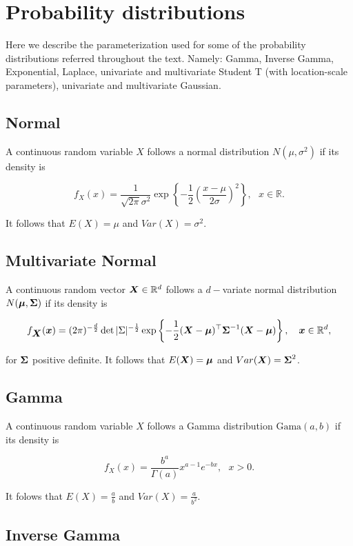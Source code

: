 

\chapter{Probability distributions}
\label{appendix_A}

Here we describe the parameterization used for some of the probability distributions referred throughout the text. Namely: Gamma, Inverse Gamma, Exponential, Laplace, univariate and multivariate Student T (with location-scale parameters), univariate and multivariate Gaussian.

\section{Normal}

A continuous random variable $X$ follows a normal distribution $N(\mu, \sigma^2)$ if its density is

$$ f_X(x) = \frac{1}{\sqrt{2\pi}\sigma^2} \exp\left\{-\frac{1}{2}\left( \frac{x - \mu}{2\sigma}\right)^2\right\}, \ \ \ x \in \mathbb{R}.$$

It follows that $E(X) = \mu$ and $Var(X) = \sigma^2$.

\section{Multivariate Normal}

A continuous random vector $\mbox{\boldmath $X$}\in \mathbb{R}^d$ follows a $d-$variate normal distribution $N(\mbox{\boldmath $\mu$}, \mbox{\boldmath $\Sigma$})$ if its density is

$$f_{\mbox{\boldmath $X$}}(\mbox{\boldmath $x$}) = (2\pi)^{-\frac{d}{2}}\det|\Sigma|^{-\frac{1}{2}}\exp\left\{ -\frac{1}{2}(\mbox{\boldmath $X$} - \mbox{\boldmath $\mu$})^{\top} \mbox{\boldmath $\Sigma$}^{-1}(\mbox{\boldmath $X$} - \mbox{\boldmath $\mu$}) \right\}, \ \ \ \mbox{\boldmath $x$} \in \mathbb{R}^d,$$

\noindent for $\mbox{\boldmath $\Sigma$}$ positive definite. It follows that $E(\mbox{\boldmath $X$}) = \mbox{\boldmath $\mu$}$ and $Var(\mbox{\boldmath $X$}) = \mbox{\boldmath $\Sigma$}^2$.

\section{Gamma}

A continuous random variable $X$ follows a Gamma distribution $\mbox{Gama}(a,b)$ if its density is

$$f_X(x)=\frac{b^a}{\Gamma(a)}x^{a-1}e^{-bx}, \ \ \ x>0.$$

It folows that $E(X)=\frac{a}{b}$ and $Var(X)=\frac{a}{b^2}$.

\section{Inverse Gamma}

